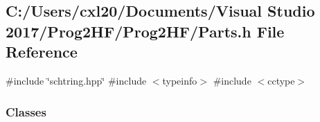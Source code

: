 \subsection{C\+:/\+Users/cxl20/\+Documents/\+Visual Studio 2017/\+Prog2\+H\+F/\+Prog2\+H\+F/\+Parts.h File Reference}
\label{_parts_8h}
{\ttfamily \#include \char`\"{}schtring.\+hpp\char`\"{}}\newline
{\ttfamily \#include $<$typeinfo$>$}\newline
{\ttfamily \#include $<$cctype$>$}\newline
\subsubsection*{Classes}
